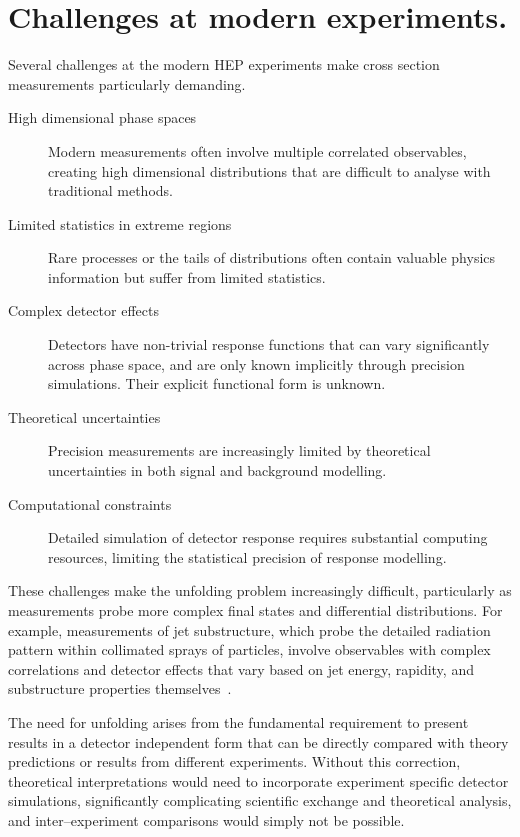 \section{Challenges at modern experiments.}
    Several challenges at the modern HEP experiments make cross section measurements particularly demanding.

    \begin{description}
        \item [High dimensional phase spaces] Modern measurements often involve multiple correlated observables, creating high dimensional distributions that are difficult to analyse with traditional methods.
        \item [Limited statistics in extreme regions] Rare processes or the tails of distributions often contain valuable physics information but suffer from limited statistics.
        \item [Complex detector effects] Detectors have non-trivial response functions that can vary significantly across phase space, and are only known implicitly through precision simulations. Their explicit functional form is unknown.
        \item [Theoretical uncertainties] Precision measurements are increasingly limited by theoretical uncertainties in both signal and background modelling.
        \item [Computational constraints] Detailed simulation of detector response requires substantial computing resources, limiting the statistical precision of response modelling.
    \end{description}

    These challenges make the unfolding problem increasingly difficult, particularly as measurements probe more complex final states and differential distributions.
    For example, measurements of jet substructure, which probe the detailed radiation pattern within collimated sprays of particles, involve observables with complex correlations and detector effects that vary based on jet energy, rapidity, and substructure properties themselves~\cite{Larkoski2020JetLearning, kogler_jet_2019, mozer_jet_2017}.
    
    The need for unfolding arises from the fundamental requirement to present results in a detector independent form that can be directly compared with theory predictions or results from different experiments.
    Without this correction, theoretical interpretations would need to incorporate experiment specific detector simulations, significantly complicating scientific exchange and theoretical analysis, and inter--experiment comparisons would simply not be possible.

